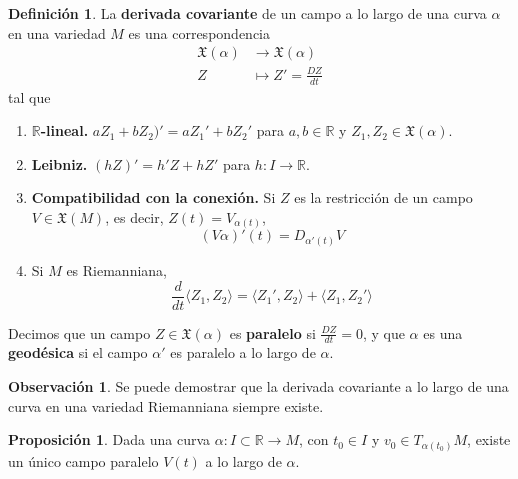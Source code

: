 \documentclass[spanish]{book}
\theoremstyle{definition}
\newtheorem*{defn}{Definición}
\newtheorem*{prop}{Proposición}
\newtheorem*{obs}{Observación}
\newcommand{\R}{\mathbb{R}}
\newcommand{\X}{\mathfrak{X}}
\begin{document}
	\begin{defn}
		La \textbf{derivada covariante} de un campo a lo largo de una curva $\alpha$ en una variedad $M$ es una correspondencia
		\begin{align*}
			\X(\alpha)&\to\X(\alpha)\\
			Z&\mapsto Z'=\frac{DZ}{dt}
		\end{align*}
		tal que 
		\begin{enumerate}
			\item \textbf{$\R$-lineal.} $aZ_1+bZ_2)'=aZ_1'+bZ_2'$ para $a,b\in\R$ y $Z_1,Z_2\in\X(\alpha)$.
			\item \textbf{Leibniz.} $(hZ)'=h'Z+hZ'$ para $h:I\to\R$.
			\item \textbf{Compatibilidad con la conexión.} Si $Z$ es la restricción de un campo $V\in\X(M)$, es decir, $Z(t)=V_{\alpha(t)}$, \[(V\alpha)'(t)=D_{\alpha'(t)}V\]
			\item Si $M$ es Riemanniana,
			\[\frac{d}{dt}\langle Z_1,Z_2\rangle=\langle Z_1',Z_2\rangle+\langle Z_1,Z_2'\rangle\]
		\end{enumerate}
		Decimos que un campo $Z\in\X(\alpha)$ es \textbf{paralelo} si $\frac{DZ}{dt}=0$, y que $\alpha$ es una \textbf{geodésica} si el campo $\alpha'$ es paralelo a lo largo de $\alpha$.
	\end{defn}
	\begin{obs}
		Se puede demostrar que la derivada covariante a lo largo de una curva en una variedad Riemanniana siempre existe.
	\end{obs}
	\begin{prop}
		Dada una curva $\alpha:I\subset\R\to M$, con $t_0\in I$ y $v_0\in T_{\alpha(t_0)}M$, existe un único campo paralelo $V(t)$ a lo largo de $\alpha$.
	\end{prop}
\end{document}
